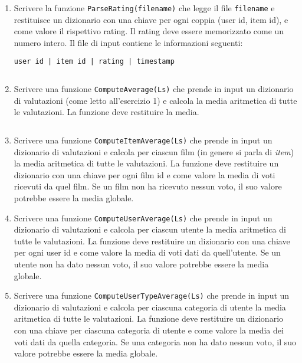 \documentclass[11pt,a4]{article}
\newcommand{\mybox}[2]{$\quad$\fbox{
\begin{minipage}{#1cm}
\hfill\vspace{#2cm}
\end{minipage}
}}
\begin{document}
\begin{enumerate}
\item Scrivere la funzione {\tt ParseRating(filename)} che legge il file {\tt filename}
e restituisce un dizionario con una chiave per ogni coppia (user id, item id), e come valore il rispettivo rating. 
Il rating deve essere memorizzato come un numero intero.
Il file di input contiene le informazioni seguenti:
\begin{center}
{\tt user id | item id | rating | timestamp}
\end{center}

\mybox{15}{2}

\item Scrivere una funzione {\tt ComputeAverage(Ls)} che prende in input un dizionario di valutazioni (come letto all'esercizio 1) e calcola
la media aritmetica di tutte le valutazioni. La funzione deve restituire la media.

\mybox{15}{2}


\item Scrivere una funzione {\tt ComputeItemAverage(Ls)} che prende in input un dizionario di valutazioni e calcola
per ciascun film (in genere si parla di {\it item}) la media aritmetica di tutte le valutazioni. La funzione deve restituire un dizionario con una chiave
per ogni film id e come valore la media di voti ricevuti da quel film. Se un film non ha ricevuto nessun voto,
il suo valore potrebbe essere la media globale.


\item Scrivere una funzione {\tt ComputeUserAverage(Ls)} che prende in input un dizionario di valutazioni e calcola
per ciascun utente la media aritmetica di tutte le valutazioni. La funzione deve restituire un dizionario con una chiave
per ogni user id e come valore la media di voti dati da quell'utente. Se un utente non ha dato nessun voto,
il suo valore potrebbe essere la media globale.


\item Scrivere una funzione {\tt ComputeUserTypeAverage(Ls)} che prende in input un dizionario di valutazioni e calcola
per ciascuna categoria di utente la media aritmetica di tutte le valutazioni. La funzione deve restituire un dizionario con una chiave
per ciascuna categoria di utente e come valore la media dei voti dati da quella categoria. Se una categoria non ha dato nessun voto,
il suo valore potrebbe essere la media globale.



\end{enumerate}
\end{document}
